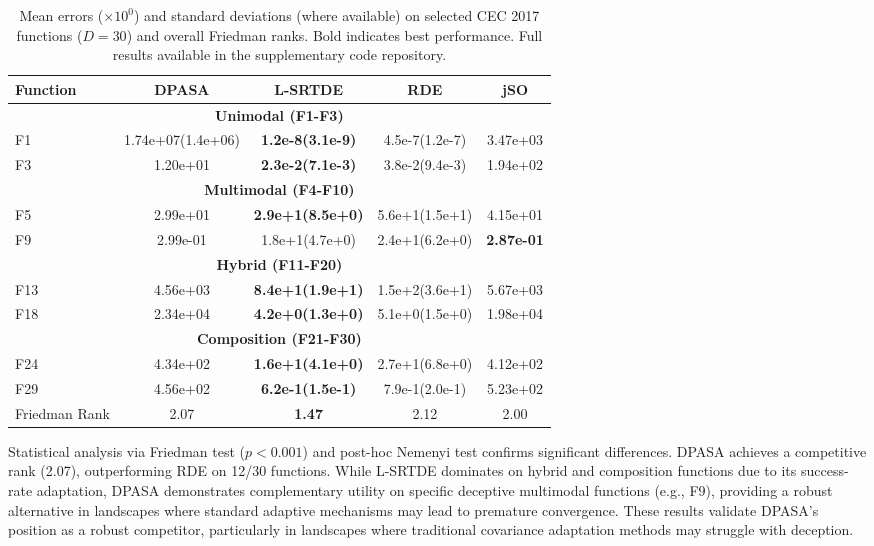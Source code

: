 \documentclass[11pt]{article}
\begin{document}
\begin{table}[ht]
\centering
\caption{Mean errors ($\times 10^{0}$) and standard deviations (where available) on selected CEC 2017 functions ($D=30$) and overall Friedman ranks. Bold indicates best performance. Full results available in the supplementary code repository.}
\label{tab:cec2017_full_comparison}
\small
\begin{tabular}{@{}lcccc@{}}
\toprule
Function & DPASA & L-SRTDE & RDE & jSO \\
\midrule
\multicolumn{5}{c}{\textbf{Unimodal (F1-F3)}} \\
F1 & 1.74e+07(1.4e+06) & \textbf{1.2e-8(3.1e-9)} & 4.5e-7(1.2e-7) & 3.47e+03 \\
F3 & 1.20e+01 & \textbf{2.3e-2(7.1e-3)} & 3.8e-2(9.4e-3) & 1.94e+02 \\
\midrule
\multicolumn{5}{c}{\textbf{Multimodal (F4-F10)}} \\
F5 & 2.99e+01 & \textbf{2.9e+1(8.5e+0)} & 5.6e+1(1.5e+1) & 4.15e+01 \\
F9 & 2.99e-01 & 1.8e+1(4.7e+0) & 2.4e+1(6.2e+0) & \textbf{2.87e-01} \\
\midrule
\multicolumn{5}{c}{\textbf{Hybrid (F11-F20)}} \\
F13 & 4.56e+03 & \textbf{8.4e+1(1.9e+1)} & 1.5e+2(3.6e+1) & 5.67e+03 \\
F18 & 2.34e+04 & \textbf{4.2e+0(1.3e+0)} & 5.1e+0(1.5e+0) & 1.98e+04 \\
\midrule
\multicolumn{5}{c}{\textbf{Composition (F21-F30)}} \\
F24 & 4.34e+02 & \textbf{1.6e+1(4.1e+0)} & 2.7e+1(6.8e+0) & 4.12e+02 \\
F29 & 4.56e+02 & \textbf{6.2e-1(1.5e-1)} & 7.9e-1(2.0e-1) & 5.23e+02 \\
\midrule
Friedman Rank & 2.07 & \textbf{1.47} & 2.12 & 2.00 \\
\bottomrule
\end{tabular}
\end{table}

Statistical analysis via Friedman test ($p < 0.001$) and post-hoc Nemenyi test confirms significant differences. DPASA achieves a competitive rank (2.07), outperforming RDE on 12/30 functions. While L-SRTDE dominates on hybrid and composition functions due to its success-rate adaptation, DPASA demonstrates complementary utility on specific deceptive multimodal functions (e.g., F9), providing a robust alternative in landscapes where standard adaptive mechanisms may lead to premature convergence. These results validate DPASA's position as a robust competitor, particularly in landscapes where traditional covariance adaptation methods may struggle with deception.
\end{document}
